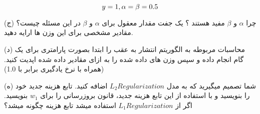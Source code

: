 \begin{equation}
y=1, \space\alpha = \beta =0.5
\end{equation}




\pagebreak

(ج) چرا $\alpha$ و $\beta$ مفید هستند ؟ یک جفت مقدار معقول برای $\alpha$ و $\beta$ در این مسئله چیست؟ مقادیر مشخصی برای این وزن ها ارایه دهید.

\vspace{2cm}

(د) محاسبات مربوطه به الگوریتم انتشار به عقب را ابتدا بصورت پارامتری برای یک گام انجام داده و سپس وزن های داده شده را به ازای مقادیر داده شده اپدیت کنید. (همراه با نرخ یادگیری برابر با 1.0)


\vspace{17cm}
(ه) شما تصمیم میگیرید که به مدل $L_2 Regularization$ اضافه کنید. تابع هزینه جدید خود را بنویسید و با استفاده از این تابع هزینه جدید، قانون بروزرسانی را برای $w_1$ بنویسید. 
اگر از $L_1 Regularization$ استفاده میشد تابع هزینه چگونه میشد؟

\pagebreak
